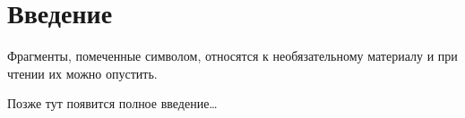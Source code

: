 \chapter*{Введение}

Фрагменты, помеченные символом\optstar, относятся к необязательному материалу и при чтении их можно опустить.

Позже тут появится полное введение\dots

\clearpage
